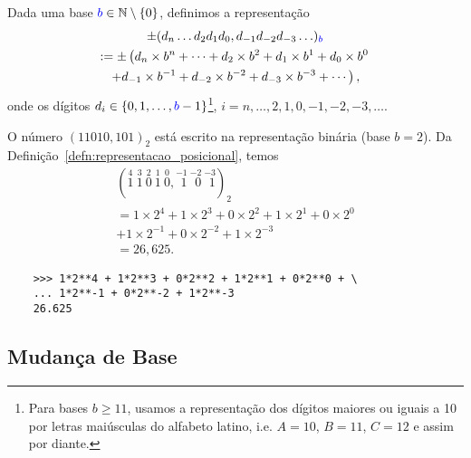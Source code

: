 \begin{defn}\label{defn:representacao_posicional}
  Dada uma base ${\color{blue}b}\in\mathbb{N}\setminus \{0\}$, definimos a representação
  \begin{gather}
    \pm (d_n\ldots d_2d_1d_0,d_{-1}d_{-2}d_{-3}\ldots)_{\color{blue}b} \\
    := \pm \left(d_n\times b^n + \cdots + d_2\times b^2 + d_1\times b^1 + d_0\times b^0\right. \\
      \left. + d_{-1}\times b^{-1} + d_{-2}\times b^{-2} + d_{-3}\times b^{-3} + \cdots\right),
  \end{gather}
onde os dígitos $d_i\in\{0, 1, \dotsc, {\color{blue}b}-1\}$\footnote{Para bases $b\geq 11$, usamos a representação dos dígitos maiores ou iguais a 10 por letras maiúsculas do alfabeto latino, i.e. $A=10$, $B=11$, $C=12$ e assim por diante.}, $i=n, \dotsc, 2, 1, 0, -1, -2, -3, \ldots$.
\end{defn}

\begin{ex}\label{ex:base_binaria}
  O número $(11010,101)_2$ está escrito na representação binária (base $b=2$). Da Definição~\ref{defn:representacao_posicional}, temos
  \begin{gather}
    (\stackrel{4}{1}~\stackrel{3}{1}~\stackrel{2}{0}~\stackrel{1}{1}~\stackrel{0}{0},\stackrel{-1}{~\,1}~\stackrel{-2}{~\,0}~\stackrel{-3}{~\,1})_2\\
    = 1\times 2^4 + 1\times 2^3 + 0\times 2^2 + 1\times 2^1 + 0\times 2^0\\
    + 1\times 2^{-1} + 0\times 2^{-2} + 1\times 2^{-3}\\
    = 26,625.
  \end{gather}

  \begin{lstlisting}
    >>> 1*2**4 + 1*2**3 + 0*2**2 + 1*2**1 + 0*2**0 + \
    ... 1*2**-1 + 0*2**-2 + 1*2**-3
    26.625
  \end{lstlisting}
\end{ex}

\subsection{Mudança de Base}

